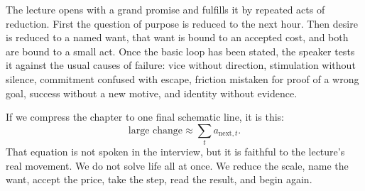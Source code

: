 The lecture opens with a grand promise and fulfills it by repeated acts of reduction. First the question of purpose is reduced to the next hour. Then desire is reduced to a named want, that want is bound to an accepted cost, and both are bound to a small act. Once the basic loop has been stated, the speaker tests it against the usual causes of failure: vice without direction, stimulation without silence, commitment confused with escape, friction mistaken for proof of a wrong goal, success without a new motive, and identity without evidence.

If we compress the chapter to one final schematic line, it is this:
\begin{equation}
\text{large change} \approx \sum_t a_{\text{next},t}.
\end{equation}
That equation is not spoken in the interview, but it is faithful to the lecture's real movement. We do not solve life all at once. We reduce the scale, name the want, accept the price, take the step, read the result, and begin again.